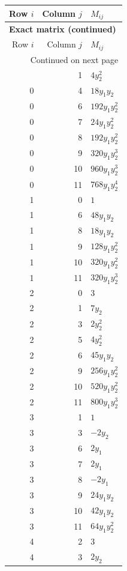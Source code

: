 \documentclass[10pt,a4paper]{article}
\begin{document}
{\small\setlength{\tabcolsep}{7pt}\begin{longtable}{rrp{125mm}}
\toprule Row $i$ & Column $j$ & $M_{ij}$\\\midrule\endfirsthead
\multicolumn{3}{l}{\textbf{Exact matrix (continued)}}\\
\toprule Row $i$ & Column $j$ & $M_{ij}$\\\midrule\endhead
\midrule\multicolumn{3}{r}{Continued on next page}\\\endfoot\bottomrule\endlastfoot
0 & 1 & $4 y_{2}^{2}$\\
0 & 4 & $18 y_{1} y_{2}$\\
0 & 6 & $192 y_{1} y_{2}^{2}$\\
0 & 7 & $24 y_{1} y_{2}^{2}$\\
0 & 8 & $192 y_{1} y_{2}^{2}$\\
0 & 9 & $320 y_{1} y_{2}^{3}$\\
0 & 10 & $960 y_{1} y_{2}^{3}$\\
0 & 11 & $768 y_{1} y_{2}^{4}$\\
1 & 0 & $1$\\
1 & 6 & $48 y_{1} y_{2}$\\
1 & 8 & $18 y_{1} y_{2}$\\
1 & 9 & $128 y_{1} y_{2}^{2}$\\
1 & 10 & $320 y_{1} y_{2}^{2}$\\
1 & 11 & $320 y_{1} y_{2}^{3}$\\
2 & 0 & $3$\\
2 & 1 & $7 y_{2}$\\
2 & 3 & $2 y_{2}^{2}$\\
2 & 5 & $4 y_{2}^{2}$\\
2 & 6 & $45 y_{1} y_{2}$\\
2 & 9 & $256 y_{1} y_{2}^{2}$\\
2 & 10 & $520 y_{1} y_{2}^{2}$\\
2 & 11 & $800 y_{1} y_{2}^{3}$\\
3 & 1 & $1$\\
3 & 3 & $- 2 y_{2}$\\
3 & 6 & $2 y_{1}$\\
3 & 7 & $2 y_{1}$\\
3 & 8 & $- 2 y_{1}$\\
3 & 9 & $24 y_{1} y_{2}$\\
3 & 10 & $42 y_{1} y_{2}$\\
3 & 11 & $64 y_{1} y_{2}^{2}$\\
4 & 2 & $3$\\
4 & 3 & $2 y_{2}$\\

\end{longtable}}
\end{document}
